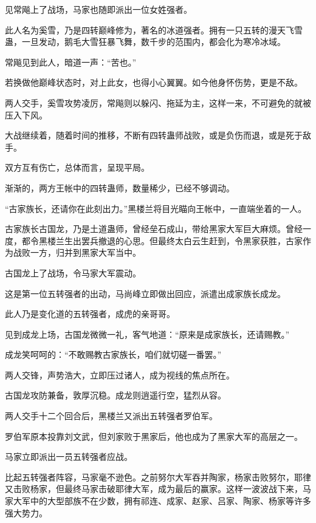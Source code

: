 
\begin{this_body}



见常飚上了战场，马家也随即派出一位女姓强者。

此人名为奚雪，乃是四转巅峰修为，著名的冰道强者。拥有一只五转的漫天飞雪蛊，一旦发动，鹅毛大雪狂暴飞舞，数千步的范围内，都会化为寒冷冰域。

常飚见到此人，暗道一声：“苦也。”

若换做他巅峰状态时，对上此女，也得小心翼翼。如今他身怀伤势，更是不敌。

两人交手，奚雪攻势凌厉，常飚则以躲闪、拖延为主，这样一来，不可避免的就被压入下风。

大战继续着，随着时间的推移，不断有四转蛊师战败，或是负伤而退，或是死于敌手。

双方互有伤亡，总体而言，呈现平局。

渐渐的，两方王帐中的四转蛊师，数量稀少，已经不够调动。

“古家族长，还请你在此刻出力。”黑楼兰将目光瞄向王帐中，一直端坐着的一人。

古家族长古国龙，乃是土道蛊师，曾经垒石成山，带给黑家大军巨大麻烦。曾经一度，都令黑楼兰生出罢兵撤退的心思。但最终太白云生赶到，令黑家获胜，古家作为战败一方，归并到黑家大军当中。

古国龙上了战场，令马家大军震动。

这是第一位五转强者的出动，马尚峰立即做出回应，派遣出成家族长成龙。

此人乃是变化道的五转强者，成虎的亲哥哥。

见到成龙上场，古国龙微微一礼，客气地道：“原来是成家族长，还请赐教。”

成龙笑呵呵的：“不敢赐教古家族长，咱们就切磋一番罢。”

两人交锋，声势浩大，立即压过诸人，成为视线的焦点所在。

古国龙攻防兼备，敦厚沉稳。成龙则逍遥行空，猛烈从容。

两人交手十二个回合后，黑楼兰又派出五转强者罗伯军。

罗伯军原本投靠刘文武，但刘家败于黑家后，他也成为了黑家大军的高层之一。

马家立即派出一员五转强者应战。

比起五转强者阵容，马家毫不逊色。之前努尔大军吞并陶家，杨家击败努尔，耶律又击败杨家，但最终马家击破耶律大军，成为最后的赢家。这样一波波战下来，马家大军中的大型部族不在少数，拥有祁连、成家、赵家、吕家、陶家、杨家等许多强大势力。


\end{this_body}
